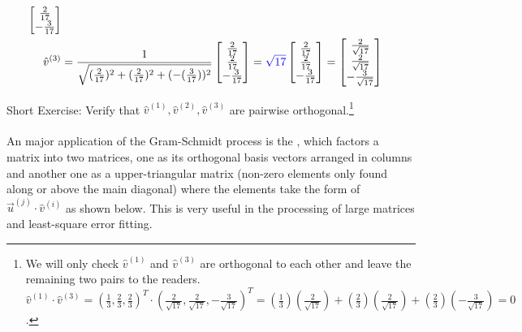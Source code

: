 \begin{solution}
\begin{align*}
\begin{bmatrix}
\frac{2}{17} \\
-\frac{3}{17}
\end{bmatrix}
\\
\hat{v}^{(3)} &= \frac{1}{\sqrt{(\frac{2}{17})^2 + (\frac{2}{17})^2 + (-(\frac{3}{17}))^2}}
\begin{bmatrix}
\frac{2}{17} \\
\frac{2}{17} \\
-\frac{3}{17}
\end{bmatrix}
=
\textcolor{blue}{\sqrt{17}}
\begin{bmatrix}
\frac{2}{17} \\
\frac{2}{17} \\
-\frac{3}{17}
\end{bmatrix}
=
\begin{bmatrix}
\frac{2}{\sqrt{17}} \\
\frac{2}{\sqrt{17}} \\
-\frac{3}{\sqrt{17}}
\end{bmatrix}
\end{align*}
\end{solution}
Short Exercise: Verify that $\hat{v}^{(1)}, \hat{v}^{(2)}, \hat{v}^{(3)}$ are pairwise orthogonal.\footnote{We will only check $\hat{v}^{(1)}$ and $\hat{v}^{(3)}$ are orthogonal to each other and leave the remaining two pairs to the readers. $\hat{v}^{(1)} \cdot \hat{v}^{(3)} = (\frac{1}{3}, \frac{2}{3}, \frac{2}{3})^T \cdot (\frac{2}{\sqrt{17}}, \frac{2}{\sqrt{17}}, -\frac{3}{\sqrt{17}})^T = (\frac{1}{3})(\frac{2}{\sqrt{17}}) + (\frac{2}{3})(\frac{2}{\sqrt{17}}) + (\frac{2}{3})(-\frac{3}{\sqrt{17}}) = 0$.} \\
\\
An major application of the Gram-Schmidt process is the , which factors a matrix into two matrices, one as its orthogonal basis vectors arranged in columns and another one as a upper-triangular matrix (non-zero elements only found along or above the main diagonal) where the elements take the form of $\vec{u}^{(j)} \cdot \hat{v}^{(i)}$ as shown below. This is very useful in the processing of large matrices and least-square error fitting.
